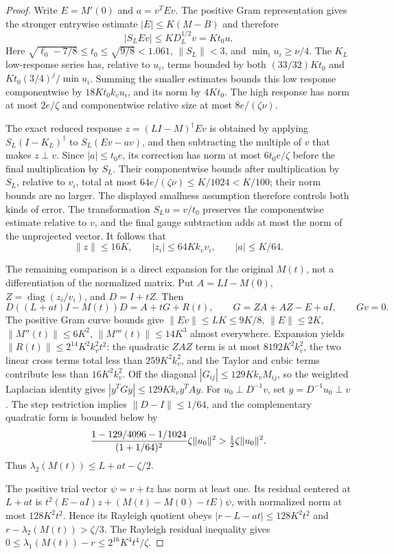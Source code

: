 \documentclass[11pt]{amsart}
\theoremstyle{remark}\newtheorem{remark}[theorem]{Remark}
\begin{document}
\begin{proof}
Write $E=M'(0)$ and $a=v^TEv$. The positive Gram representation gives the
stronger entrywise estimate $|E|\le K(M-B)$ and therefore
\[
 |S_LEv|\le K D_L^{1/2}v=Kt_0u.
\]
Here $\sqrt{\ell_0-7/8}\le t_0\le\sqrt{9/8}<1.061$,
$\|S_L\|<3$, and $\min_i u_i\ge\nu/4$.
The $K_L$ low-response series has, relative to $u_i$, terms bounded by
both $(33/32)Kt_0$ and $Kt_0(3/4)^j/\min u_i$.
Summing the smaller estimates bounds this low response componentwise by
$18Kt_0k_vu_i$, and its norm by $4Kt_0$.
The high response has norm at most $2e/\zeta$ and componentwise relative
size at most $8e/(\zeta\nu)$.

The exact reduced response $z=(LI-M)^\dagger Ev$ is obtained by applying
$S_L(I-K_L)^\dagger$ to $S_L(Ev-av)$, and then subtracting the multiple
of $v$ that makes $z\perp v$.
Since $|a|\le t_0 e$, its correction has norm at most
$6t_0e/\zeta$ before the final multiplication by $S_L$.
Their componentwise bounds after multiplication by $S_L$, relative to
$v_i$, total at most $64e/(\zeta\nu)\le K/1024<K/100$; their norm
bounds are no larger. The displayed smallness assumption therefore
controls both kinds of error. The transformation $S_Lu=v/t_0$ preserves the
componentwise estimate relative to $v$, and the final gauge subtraction
adds at most the norm of the unprojected vector. It follows that
\[
 \|z\|\le16K,\qquad |z_i|\le64Kk_vv_i,
 \qquad |a|\le K/64.
\]

The remaining comparison is a direct expansion for the original $M(t)$,
not a differentiation of the normalized matrix. Put
$A=LI-M(0)$, $Z=\operatorname{diag}(z_i/v_i)$, and $D=I+tZ$.
Then
\[
 D((L+at)I-M(t))D=A+tG+R(t),\qquad
 G=ZA+AZ-E+aI,\qquad Gv=0.
\]
The positive Gram curve bounds give $\|Ev\|\le LK\le9K/8$,
$\|E\|\le2K$,
$\|M''(t)\|\le6K^2$, $\|M'''(t)\|\le14K^3$ almost everywhere.
Expansion yields $\|R(t)\|\le2^{14}K^2k_v^2t^2$:
the quadratic $ZAZ$ term is at most $8192K^2k_v^2$,
the two linear cross terms total less than $259K^2k_v^2$,
and the Taylor and cubic terms contribute less than $16K^2k_v^2$.
Off the diagonal $|G_{ij}|\le129Kk_vM_{ij}$, so the weighted Laplacian
identity gives $|y^TGy|\le129Kk_vy^TAy$.
For $u_0\perp D^{-1}v$, set $y=D^{-1}u_0\perp v$.
The step restriction implies $\|D-I\|\le1/64$, and the complementary
quadratic form is bounded below by
\[
 {1-129/4096-1/1024\over(1+1/64)^2}\zeta\|u_0\|^2
 >\tfrac12\zeta\|u_0\|^2.
\]
Thus $\lambda_2(M(t))\le L+at-\zeta/2$.

The positive trial vector $\psi=v+tz$ has norm at least one. Its residual
centered at $L+at$ is
$t^2(E-aI)z+(M(t)-M(0)-tE)\psi$, with normalized norm at most
$128K^2t^2$. Hence its Rayleigh quotient obeys
$|r-L-at|\le128K^2t^2$ and $r-\lambda_2(M(t))>\zeta/3$.
The Rayleigh residual inequality gives
$0\le\lambda_1(M(t))-r\le2^{16}K^4t^4/\zeta$.


\end{proof}
\end{document}
